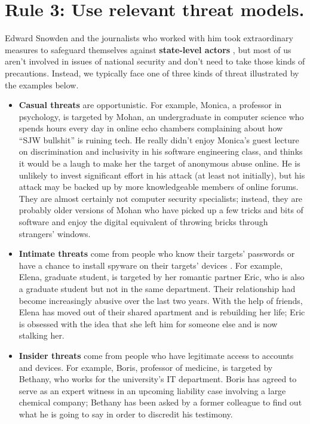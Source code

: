 \documentclass[10pt, letterpaper]{article}
\begin{document}
\section*{Rule 3: Use relevant threat models.}

Edward Snowden and the journalists who worked with him took extraordinary
measures to safeguard themselves against \textbf{state-level actors}
\cite{Snow2019}, but most of us aren't involved in issues of national
security and don't need to take those kinds of precautions. Instead, we
typically face one of three kinds of threat illustrated by the examples below.

\begin{itemize}
\item
  \textbf{Casual threats} are opportunistic. For example, Monica, a professor in
  psychology, is targeted by Mohan, an undergraduate in computer science who
  spends hours every day in online echo chambers complaining about how ``SJW
  bullshit'' is ruining tech. He really didn't enjoy Monica's guest lecture on
  discrimination and inclusivity in his software engineering class, and thinks
  it would be a laugh to make her the target of anonymous abuse online. He is
  unlikely to invest significant effort in his attack (at least not initially),
  but his attack may be backed up by more knowledgeable members of online
  forums. They are almost certainly not computer security specialists; instead,
  they are probably older versions of Mohan who have picked up a few tricks and
  bits of software and enjoy the digital equivalent of throwing bricks through
  strangers' windows.

\item
  \textbf{Intimate threats} come from people who know their targets' passwords
  or have a chance to install spyware on their targets' devices \cite{Leit2019}.
  For example, Elena, graduate student, is targeted by her romantic partner
  Eric, who is also a graduate student but not in the same department. Their
  relationship had become increasingly abusive over the last two years. With the
  help of friends, Elena has moved out of their shared apartment and is
  rebuilding her life; Eric is obsessed with the idea that she left him for
  someone else and is now stalking her.

\item
  \textbf{Insider threats} come from people who have legitimate access to
  accounts and devices. For example, Boris, professor of medicine, is targeted
  by Bethany, who works for the university's IT department.  Boris has agreed to
  serve as an expert witness in an upcoming liability case involving a large
  chemical company; Bethany has been asked by a former colleague to find out
  what he is going to say in order to discredit his testimony.
\end{itemize}
\end{document}
